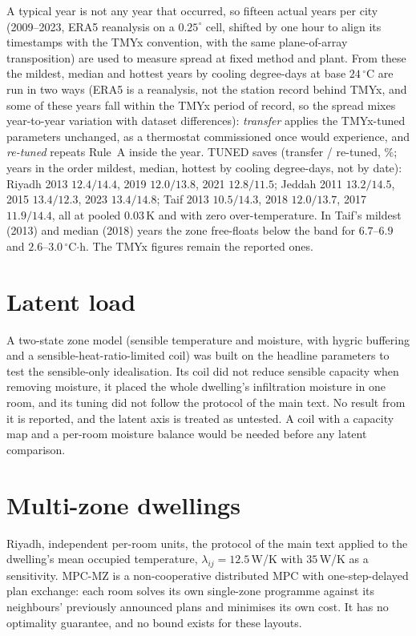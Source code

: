 \documentclass[11pt]{article}
\newcommand{\lij}{\lambda_{ij}}
\begin{document}
A typical year is not any year that occurred, so fifteen actual years per city (2009--2023, ERA5 reanalysis on a $0.25^\circ$ cell, shifted by one hour to align its timestamps with the TMYx convention, with the same plane-of-array transposition) are used to measure spread at fixed method and plant. From these the mildest, median and hottest years by cooling degree-days at base $24\,^\circ$C are run in two ways (ERA5 is a reanalysis, not the station record behind TMYx, and some of these years fall within the TMYx period of record, so the spread mixes year-to-year variation with dataset differences): \emph{transfer} applies the TMYx-tuned parameters unchanged, as a thermostat commissioned once would experience, and \emph{re-tuned} repeats Rule~A inside the year. TUNED saves (transfer / re-tuned, \%; years in the order mildest, median, hottest by cooling degree-days, not by date): Riyadh 2013 $12.4/14.4$, 2019 $12.0/13.8$, 2021 $12.8/11.5$; Jeddah 2011 $13.2/14.5$, 2015 $13.4/12.3$, 2023 $13.4/14.8$; Taif 2013 $10.5/14.3$, 2018 $12.0/13.7$, 2017 $11.9/14.4$, all at pooled $0.03\,$K and with zero over-temperature. In Taif's mildest (2013) and median (2018) years the zone free-floats below the band for $6.7$--$6.9$ and $2.6$--$3.0\,^\circ$C$\cdot$h. The TMYx figures remain the reported ones.

\section{Latent load}
\label{sec:s-latent}

A two-state zone model (sensible temperature and moisture, with hygric buffering and a sensible-heat-ratio-limited coil) was built on the headline parameters to test the sensible-only idealisation. Its coil did not reduce sensible capacity when removing moisture, it placed the whole dwelling's infiltration moisture in one room, and its tuning did not follow the protocol of the main text. No result from it is reported, and the latent axis is treated as untested. A coil with a capacity map and a per-room moisture balance would be needed before any latent comparison.

\section{Multi-zone dwellings}
\label{sec:s-mz}

Riyadh, independent per-room units, the protocol of the main text applied to the dwelling's mean occupied temperature, $\lij=12.5\,$W/K with $35\,$W/K as a sensitivity. MPC-MZ is a non-cooperative distributed MPC with one-step-delayed plan exchange: each room solves its own single-zone programme against its neighbours' previously announced plans and minimises its own cost. It has no optimality guarantee, and no bound exists for these layouts.
\end{document}
